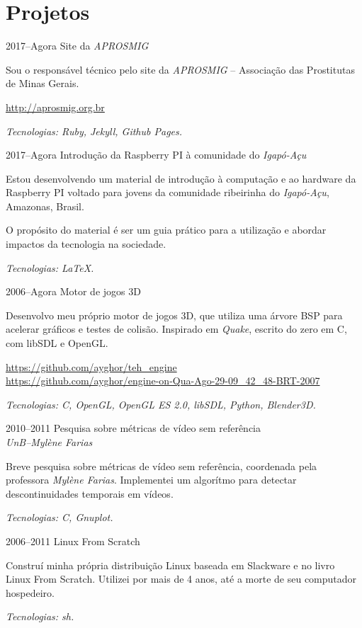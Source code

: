 \documentclass[a4paper]{simplecv}
\begin{document}
\section{Projetos}

\begin{topic}
\item[2017--Agora] Site da \emph{APROSMIG}

	Sou o responsável técnico pelo site da \emph{APROSMIG} -- Associação
	das Prostitutas de Minas Gerais.

	{\scriptsize\url{http://aprosmig.org.br}}

	{\em\scriptsize Tecnologias: Ruby, Jekyll, Github Pages.}

\item[2017--Agora] Introdução da Raspberry PI à comunidade do \emph{Igapó-Açu}

	Estou desenvolvendo um material de introdução à computação e ao
	hardware da Raspberry PI voltado para jovens da comunidade ribeirinha
	do \emph{Igapó-Açu}, Amazonas, Brasil.

	O propósito do material é ser um guia prático para a utilização e
	abordar impactos da tecnologia na sociedade.

	{\em\scriptsize Tecnologias: \LaTeX{}.}

\item[2006--Agora] Motor de jogos 3D

	Desenvolvo meu próprio motor de jogos 3D, que utiliza uma árvore BSP
	para acelerar gráficos e testes de colisão. Inspirado em \emph{Quake},
	escrito do zero em C, com libSDL e OpenGL.

	{\scriptsize\url{https://github.com/ayghor/teh_engine}}\\
	{\scriptsize\url{https://github.com/ayghor/engine-on-Qua-Ago-29-09\_42\_48-BRT-2007}}

	{\em\scriptsize Tecnologias: C, OpenGL, OpenGL ES 2.0, libSDL, Python,
	Blender3D.}

\item[2010--2011] Pesquisa sobre métricas de vídeo sem referência\\
	{\em\small UnB--Mylène Farias}

	Breve pesquisa sobre métricas de vídeo sem referência, coordenada pela
	professora \emph{Mylène Farias}. Implementei um algorítmo para detectar
	descontinuidades temporais em vídeos.

	{\em\scriptsize Tecnologias: C, Gnuplot.}

\item[2006--2011] Linux From Scratch

	Construí minha própria distribuição Linux baseada em Slackware e no
	livro Linux From Scratch. Utilizei por mais de 4 anos, até a morte de
	seu computador hospedeiro.

	{\em\scriptsize Tecnologias: sh.}

\end{topic}
\end{document}
